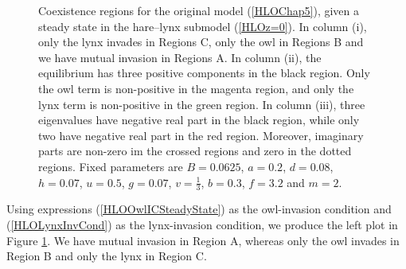 \documentclass[12pt]{UOthesis}
\theoremstyle{remarkstyle}
\begin{document}
\begin{figure}[h!]
	\centering
	
	\caption[Regions for the original model (steady state)]{Coexistence regions for the original model (\ref{HLOChap5}), given a steady state in the hare--lynx submodel (\ref{HLOz=0}). In column (i), only the lynx invades in Regions C, only the owl in Regions B and we have mutual invasion in Regions A. In column (ii), the equilibrium has three positive components in the black region. Only the owl term is non-positive in the magenta region, and only the lynx term is non-positive in the green region. In column (iii), three eigenvalues have negative real part in the black region, while only two have negative real part in the red region. Moreover, imaginary parts are non-zero im the crossed regions and zero in the dotted regions. Fixed parameters are $B=0.0625$, $a=0.2$, $d=0.08$, $h=0.07$, $u=0.5$, $g=0.07$, $v=\frac{1}{3}$, $b=0.3$, $f=3.2$ and $m=2$.\label{HLOSSRegions}}%
\end{figure}


Using expressions (\ref{HLOOwlICSteadyState}) as the owl-invasion condition and (\ref{HLOLynxInvCond}) as the lynx-invasion condition, we produce the left plot in Figure \ref{HLOSSRegions}. We have mutual invasion in Region A, whereas only the owl invades in Region B and only the lynx in Region C.\\
\end{document}
